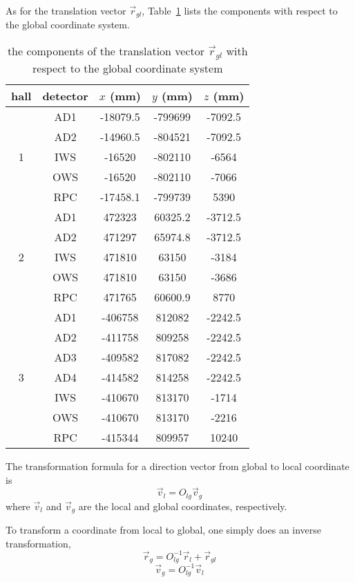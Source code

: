 \documentclass[letterpaper, 11pt]{scrartcl} %
\numberwithin{equation}{section} %
\numberwithin{figure}{section} %
\numberwithin{table}{section} %
\begin{document}
As for the translation vector $\vec{r}_{gl}$, Table~\ref{table:translation} lists the components with respect to the global coordinate system.%

\begin{table}
	\centering
	\begin{tabular}{|c|c|c c c|}
		\hline
		hall & detector & $x$ (mm) & $y$ (mm) & $z$ (mm)\\
		\hline
		\multirow{5}{*}{1} & AD1 & -18079.5 & -799699 & -7092.5 \\
		& AD2 & -14960.5 & -804521 & -7092.5 \\
		& IWS & -16520 & -802110 & -6564 \\
		& OWS & -16520 & -802110 & -7066 \\
		& RPC & -17458.1 & -799739 & 5390 \\
		\hline
		\multirow{5}{*}{2} & AD1 & 472323 & 60325.2 & -3712.5 \\
		& AD2 & 471297 & 65974.8 & -3712.5 \\
		& IWS & 471810 & 63150 & -3184 \\
		& OWS & 471810 & 63150 & -3686 \\
		& RPC & 471765 & 60600.9 & 8770 \\
		\hline
		\multirow{7}{*}{3} & AD1 & -406758 & 812082 & -2242.5 \\
		& AD2 & -411758 & 809258 & -2242.5 \\
		& AD3 & -409582 & 817082 & -2242.5 \\
		& AD4 & -414582 & 814258 & -2242.5 \\
		& IWS & -410670 & 813170 & -1714 \\
		& OWS & -410670 & 813170 & -2216 \\
		& RPC & -415344 & 809957 & 10240 \\
		\hline
	\end{tabular}
	\caption{the components of the translation vector $\vec{r}_{gl}$ with respect to the global coordinate system}
	\label{table:translation}
\end{table}

The transformation formula for a direction vector from global to local coordinate is
\begin{equation}
  \vec{v}_l=O_{lg}\vec{v}_g
\end{equation}
where $\vec{v}_l$ and $\vec{v}_g$ are the local and global coordinates, respectively.

To transform a coordinate from local to global, one simply does an inverse transformation,
\begin{equation}
	\vec{r}_g=O_{lg}^{-1}\vec{r}_l+\vec{r}_{gl}
\end{equation}
\begin{equation}
	\vec{v}_g=O_{lg}^{-1}\vec{v}_l
\end{equation}
\end{document}
